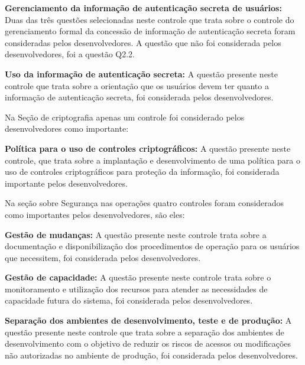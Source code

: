 \vspace{0.5cm}
\noindent\textbf{Gerenciamento da informação de autenticação secreta de usuários:}
Duas das três questões selecionadas neste controle que trata sobre o controle do gerenciamento formal da  concessão de informação de autenticação secreta foram consideradas pelos desenvolvedores. A questão que não foi considerada pelos desenvolvedores, foi a questão Q2.2.

\vspace{0.5cm}
\noindent\textbf{Uso da informação de autenticação secreta:}
A questão presente neste controle que trata sobre a orientação que os usuários devem ter quanto a informação de autenticação secreta, foi considerada pelos desenvolvedores.

\vspace{0.5cm}

Na Seção de criptografia apenas um controle foi considerado pelos desenvolvedores como importante:

\vspace{0.5cm}
\noindent\textbf{Política para o uso de controles criptográficos:}
A questão presente neste controle, que trata sobre a implantação e desenvolvimento de uma política para o uso de controles criptográficos para proteção da informação, foi considerada importante pelos desenvolvedores.
\vspace{0.5cm}

Na seção sobre Segurança nas operações quatro controles foram considerados como importantes pelos desenvolvedores, são eles:

\vspace{0.5cm}
\noindent\textbf{Gestão de mudanças:}
A questão presente neste controle trata sobre a documentação e disponibilização dos procedimentos de operação para os usuários que necessitem, foi considerada pelos desenvolvedores.

\vspace{0.5cm}
\noindent\textbf{Gestão de capacidade:}
A questão presente neste controle trata sobre o monitoramento e utilização dos recursos para atender as necessidades de capacidade futura do sistema, foi considerada pelos desenvolvedores.

\vspace{0.5cm}
\noindent\textbf{Separação dos ambientes de desenvolvimento, teste e de produção:}
A questão presente neste controle que trata sobre a separação dos ambientes de desenvolvimento com o objetivo de reduzir os riscos de acessos ou modificações não autorizadas no ambiente de produção, foi considerada pelos desenvolvedores.

